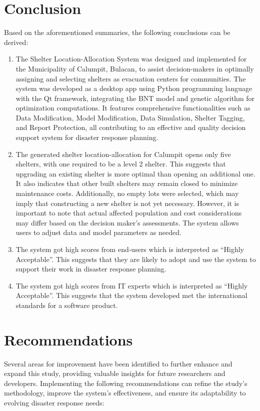 \section{Conclusion}
	Based on the aforementioned summaries, the following conclusions can be derived:

	\begin{enumerate}
		\item The Shelter Location-Allocation System was designed and implemented for the Municipality of Calumpit, Bulacan, to assist decision-makers in optimally assigning and selecting shelters as evacuation centers for communities. The system was developed as a desktop app using Python programming language with the Qt framework, integrating the BNT model and genetic algorithm for optimization computations. It features comprehensive functionalities such as Data Modification, Model Modification, Data Simulation, Shelter Tagging, and Report Protection, all contributing to an effective and quality decision support system for disaster response planning.
		\item The generated shelter location-allocation for Calumpit opens only five shelters, with one required to be a level 2 shelter. This suggests that upgrading an existing shelter is more optimal than opening an additional one. It also indicates that other built shelters may remain closed to minimize maintenance costs. Additionally, no empty lots were selected, which may imply that constructing a new shelter is not yet necessary. However, it is important to note that actual affected population and cost considerations may differ based on the decision maker's assessments. The system allows users to adjust data and model parameters as needed.
		\item The system got high scores from end-users which is interpreted as “Highly Acceptable”. This suggests that they are likely to adopt and use the system to support their work in disaster response planning.
		\item The system got high scores from IT experts which is interpreted as “Highly Acceptable”. This suggests that the system developed met the international standards for a software product.
	\end{enumerate}

\section{Recommendations}
	Several areas for improvement have been identified to further enhance and expand this study, providing valuable insights for future researchers and developers. Implementing the following recommendations can refine the study’s methodology, improve the system’s effectiveness, and ensure its adaptability to evolving disaster response needs:
	
